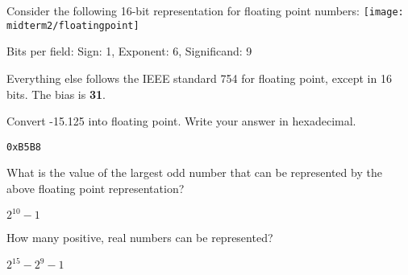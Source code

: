 \begin{blocksection}
Consider the following 16-bit representation for floating point numbers:
\texttt{[image: midterm2/floatingpoint]}

Bits per field:
Sign: 1, Exponent: 6, Significand: 9

Everything else follows the IEEE standard 754 for floating point, except in 16 bits.
The bias is \textbf{31}.

\question
Convert -15.125 into floating point. Write your answer in hexadecimal.
\begin{solution}[0.5in]
\lstinline$0xB5B8$
\end{solution}


\question
What is the value of the largest odd number that can be represented by the above floating point representation?
\begin{solution}[0.5in]
$2^{10} - 1$
\end{solution}


\question
How many positive, real numbers can be represented?
\begin{solution}[0.5in]
$2^{15} - 2^9 - 1$
\end{solution}

\end{blocksection}